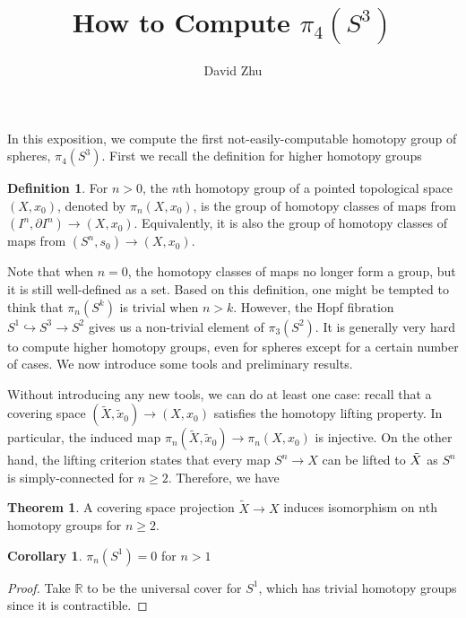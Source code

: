 \documentclass{article}
\title{How to Compute $\pi_4(S^3)$}
\author{David Zhu}
\theoremstyle{definition}
\newtheorem{theorem}{Theorem}[section]
\theoremstyle{definition}
\theoremstyle{definition}
\theoremstyle{definition}
\theoremstyle{definition}
\newtheorem{definition}{Definition}[section]
\theoremstyle{definition}
\newtheorem{corollary}{Corollary}[theorem]
\theoremstyle{definition}
\begin{document}
\maketitle


In this exposition, we compute the first not-easily-computable homotopy group of spheres, $\pi_4(S^3)$. First we recall the definition for higher homotopy groups

\begin{tcolorbox}[colback=purple!5!white,colframe=purple!75!black]
\begin{definition}
For $n>0$, the  $n$th homotopy group of a pointed topological space $(X,x_0)$, denoted by $\pi_n(X,x_0)$, is the group of homotopy classes of maps from $(I^n,\partial I^n)\to (X,x_0)$. Equivalently, it is also the group of homotopy classes of maps from $(S^n,s_0)\to (X,x_0)$. 
\end{definition}
\end{tcolorbox}
Note that when $n=0$, the homotopy classes of maps no longer form a group, but it is still well-defined as a set. Based on this definition, one might be tempted to think that $\pi_n(S^k)$ is trivial when $n>k$. However, the Hopf fibration $S^1\hookrightarrow S^3\to S^2$ gives us a non-trivial element of $\pi_3(S^2)$. It is generally very hard to compute higher homotopy groups, even for spheres except for a certain number of cases. We now introduce some tools and preliminary results.

Without introducing any new tools, we can do at least one case: recall that a covering space $(\tilde{X},\tilde{x}_0)\to (X,x_0)$ satisfies the homotopy lifting property. In particular, the induced map $\pi_n(\tilde{X},\tilde{x}_0)\to \pi_n(X,x_0)$ is injective. On the other hand, the lifting criterion states that every map $S^n\to X$ can be lifted to $\Tilde{X}$ as $S^n$ is simply-connected for $n\geq 2$. Therefore, we have

\begin{tcolorbox}[colback=red!5!white,colframe=red!30!white]
\begin{theorem}
A covering space projection $\tilde{X}\to X$ induces isomorphism on nth homotopy groups for $n\geq 2$.
\end{theorem}
\end{tcolorbox}

\begin{tcolorbox}[colback=green!5!white,colframe=green!30!white]
\begin{corollary}
    $\pi_n(S^1)=0$ for $n>1$
\end{corollary}
\end{tcolorbox}
\begin{proof}
    Take $\mathbb{R}$ to be the universal cover for $S^1$, which has trivial homotopy groups since it is contractible.
\end{proof}
\end{document}
